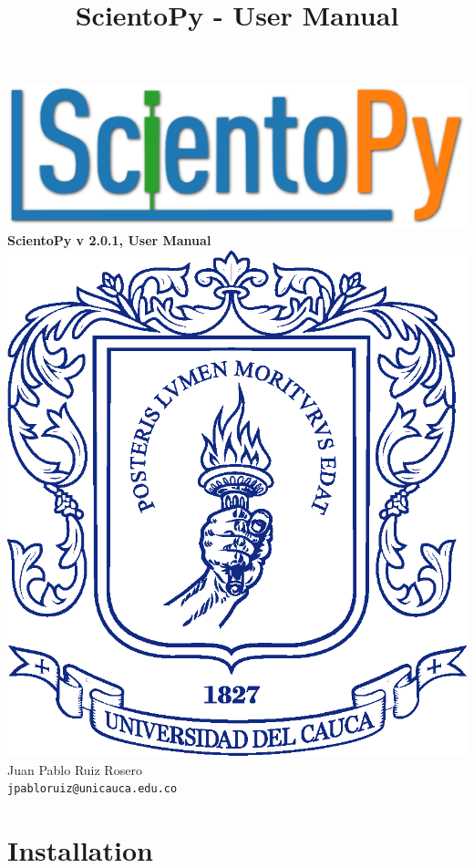 \documentclass[10pt,letterpaper]{article}
\title{ScientoPy - User Manual}
\begin{document}
\begin{center}
\includegraphics[scale=0.5]{./figures/scientopy_logo.eps}\\
{\LARGE \textbf{ScientoPy v 2.0.1, User Manual\\}}
\vspace*{0.5cm}
\includegraphics[scale=0.2]{./figures/escudoUnicacuaSolo.eps}\\
\vspace*{0.5cm}
Juan Pablo Ruiz Rosero\\
\texttt{jpabloruiz@unicauca.edu.co} \\
\end{center}

\tableofcontents

\newpage

\section{Installation}
\end{document}

